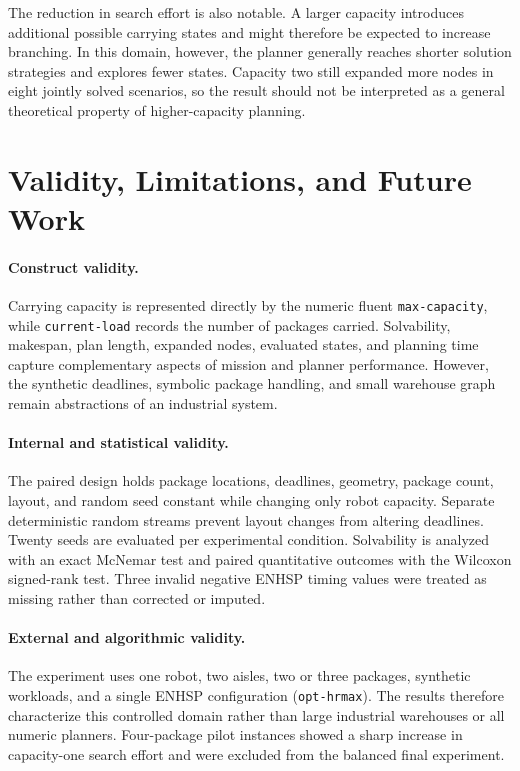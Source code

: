 \documentclass[conference]{IEEEtran}
\begin{document}
The reduction in search effort is also notable. A larger capacity introduces
additional possible carrying states and might therefore be expected to
increase branching. In this domain, however, the planner generally reaches
shorter solution strategies and explores fewer states. Capacity two still
expanded more nodes in eight jointly solved scenarios, so the result should not
be interpreted as a general theoretical property of higher-capacity planning.



\section{Validity, Limitations, and Future Work}

\paragraph{Construct validity.}
Carrying capacity is represented directly by the numeric fluent
\texttt{max-capacity}, while \texttt{current-load} records the number of
packages carried. Solvability, makespan, plan length, expanded nodes, evaluated
states, and planning time capture complementary aspects of mission and planner
performance. However, the synthetic deadlines, symbolic package handling, and
small warehouse graph remain abstractions of an industrial system.

\paragraph{Internal and statistical validity.}
The paired design holds package locations, deadlines, geometry, package count,
layout, and random seed constant while changing only robot capacity. Separate
deterministic random streams prevent layout changes from altering deadlines.
Twenty seeds are evaluated per experimental condition. Solvability is analyzed
with an exact McNemar test and paired quantitative outcomes with the Wilcoxon
signed-rank test. Three invalid negative ENHSP timing values were treated as
missing rather than corrected or imputed.

\paragraph{External and algorithmic validity.}
The experiment uses one robot, two aisles, two or three packages, synthetic
workloads, and a single ENHSP configuration (\texttt{opt-hrmax}). The results
therefore characterize this controlled domain rather than large industrial
warehouses or all numeric planners. Four-package pilot instances showed a sharp
increase in capacity-one search effort and were excluded from the balanced
final experiment.
\end{document}
